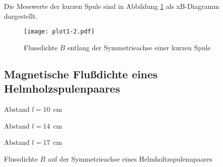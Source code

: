 \noindent Die Messwerte der kurzen Spule sind in Abbildung
\ref{fig:b} als xB-Diagramm dargestellt.

\begin{figure}
\centering
  \texttt{[image: plot1-2.pdf]}
   \caption{Flussdichte $B$ entlang der Symmetrieachse einer kurzen Spule}
  \label{fig:b}
\end{figure}

\subsection{Magnetische Flußdichte eines Helmholzspulenpaares}
  
  \begin{table}[H]
  \centering
    \begin{subtable}{.3\linewidth}
      \centering
            \caption{Abstand $l=10\:\:\si{\centi\meter}$}

    \end{subtable}%
    \begin{subtable}{.3\linewidth}
      \centering
            \caption{Abstand $l=14\:\:\si{\centi\meter}$}

    \end{subtable} 
    \begin{subtable}{.3\linewidth}
      \centering
            \caption{Abstand $l=17\:\:\si{\centi\meter}$}

    \end{subtable} 
        \caption{Flussdichte $B$ auf der Symmetrieachse eines Helmholtzspulennpaares}
    \label{tab:3}
\end{table}
